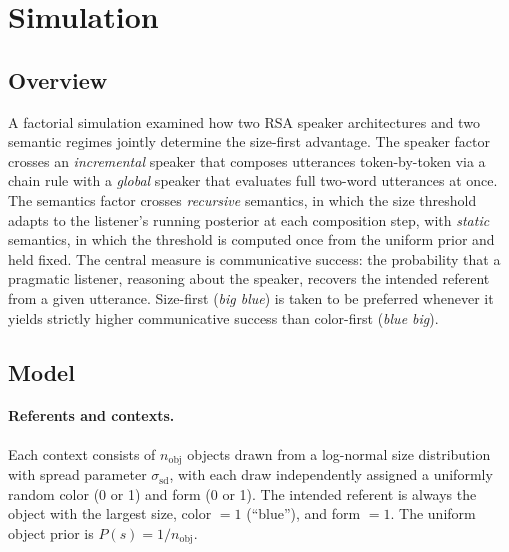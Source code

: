 
\section{Simulation}

\subsection{Overview}

A factorial simulation examined how two RSA speaker architectures and two
semantic regimes jointly determine the size-first advantage.
The speaker factor crosses an \textit{incremental} speaker that composes
utterances token-by-token via a chain rule with a \textit{global} speaker
that evaluates full two-word utterances at once.
The semantics factor crosses \textit{recursive} semantics, in which the
size threshold adapts to the listener's running posterior at each
composition step, with \textit{static} semantics, in which the threshold is
computed once from the uniform prior and held fixed.
The central measure is communicative success: the probability that a
pragmatic listener, reasoning about the speaker, recovers the intended
referent from a given utterance.
Size-first (\textit{big blue}) is taken to be preferred whenever it yields
strictly higher communicative success than color-first (\textit{blue big}).

\subsection{Model}

\paragraph{Referents and contexts.}
Each context consists of $n_{\text{obj}}$ objects drawn from a
log-normal size distribution with spread parameter $\sigma_{\text{sd}}$,
with each draw independently assigned a uniformly random color (0 or 1) and
form (0 or 1).
The intended referent is always the object with the largest size, color
$= 1$ (``blue''), and form $= 1$.
The uniform object prior is $P(s) = 1/n_{\text{obj}}$.

